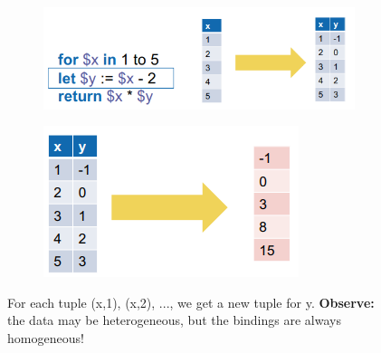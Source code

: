 \documentclass[11pt,oneside,a4paper]{article}
\begin{document}
{\begin{figure}[hb!]
	\centering
	\begin{subfigure}[t]{.5\textwidth}
		\centering
		\includegraphics[width=0.7\linewidth]{figures/queryingtrees_tuples_21}
	\end{subfigure}%
	\begin{subfigure}[t]{.5\textwidth}
		\centering
		\includegraphics[width=0.4\linewidth]{figures/queryingtrees_tuples_22}
	\end{subfigure}
	\caption{For each tuple (x,1), (x,2), ..., we get a new tuple for y. \textbf{Observe:} the data may be heterogeneous, but the bindings are always homogeneous!}
\end{figure}

}
\end{document}
